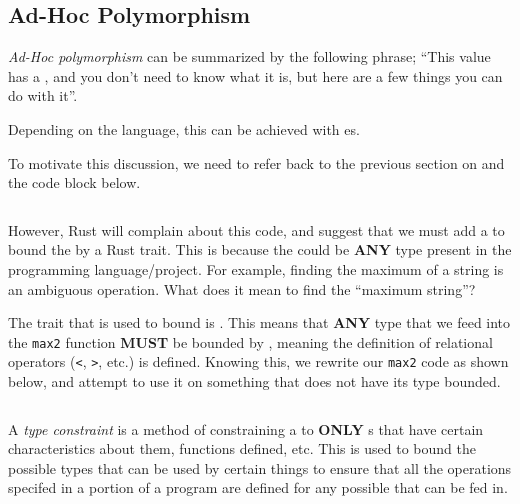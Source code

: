 \subsection{Ad-Hoc Polymorphism}\label{subsec:Ad_Hoc_Polymorphism}
\begin{definition}\label{def:Ad_Hoc_Polymorphism}
  \emph{Ad-Hoc polymorphism} can be summarized by the following phrase; ``This value has a , and you don't need to know what it is, but here are a few things you can do with it''.

  Depending on the language, this can be achieved with es.
\end{definition}

To motivate this discussion, we need to refer back to the previous section on  and the code block below.
\inputminted[frame=lines,linenos]{rust}{./EDAP05-Concepts_Programming_Languages-Sections/Advanced_Data_Types/Code/Parametric_Polymorphic_Max.rs}
However, Rust will complain about this code, and suggest that we must add a  to bound the   by a Rust trait.
This is because the   could be \textbf{ANY} type present in the programming language/project.
For example, finding the maximum of a string is an ambiguous operation.
What does it mean to find the ``maximum string''?

The trait that is used to bound  is .
This means that \textbf{ANY} type  that we feed into the \texttt{max2} function \textbf{MUST} be bounded by , meaning the definition of relational operators (\texttt{<}, \texttt{>}, etc.) is defined.
Knowing this, we rewrite our \texttt{max2} code as shown below, and attempt to use it on something that does not have its type bounded.
\inputminted[frame=lines,linenos]{rust}{./EDAP05-Concepts_Programming_Languages-Sections/Advanced_Data_Types/Code/Parametric_Polymorphic_Max-Start_Typeclass.rs}

\begin{definition}\label{def:Type_Constraint}
  A \emph{type constraint} is a method of constraining a  to \textbf{ONLY} s that have certain characteristics about them, functions defined, etc.
  This is used to bound the possible types that can be used by certain things to ensure that all the operations specifed in a portion of a program are defined for any possible  that can be fed in.
\end{definition}

